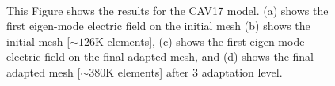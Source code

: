 \documentclass[review,12pt]{elsarticle_summary_report}
\begin{document}
\begin{landscape}
\begin{figure}[ph!]
\centering
{}
\hspace*{50pt}
\\
\hspace*{50pt}
\caption{\label{cav}  This Figure shows the results for the CAV17 model. (a) shows the first eigen-mode electric field on the initial mesh (b) shows the initial  mesh [$\sim126\text{K}$ elements], (c) shows the first eigen-mode electric field on the final adapted mesh, and (d) shows the final adapted mesh [$\sim380\text{K}$ elements] after 3 adaptation level.}
\end{figure}
\end{landscape}
\end{document}
